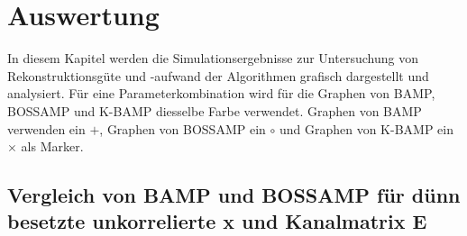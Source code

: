 
\chapter{Auswertung}
\label{sec:Auswertung}
In diesem Kapitel werden die Simulationsergebnisse zur Untersuchung von Rekonstruktionsgüte und -aufwand der Algorithmen grafisch dargestellt und analysiert. Für eine Parameterkombination wird für die Graphen von BAMP, BOSSAMP und K-BAMP diesselbe Farbe verwendet. Graphen von BAMP verwenden ein $+$, Graphen von BOSSAMP ein $\circ$ und Graphen von K-BAMP ein $\times$ als Marker.
\section{Vergleich von BAMP und BOSSAMP für dünn besetzte unkorrelierte x und Kanalmatrix E}

